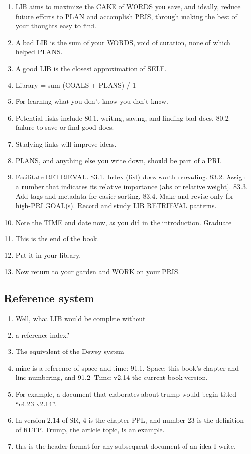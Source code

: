 \documentclass[
]{book}
\providecommand{\tightlist}{%
  \setlength{\itemsep}{0pt}\setlength{\parskip}{0pt}}
\begin{document}
\begin{enumerate}
\def\labelenumi{\arabic{enumi}.}
\setcounter{enumi}{74}
\tightlist
\item
  LIB aims to maximize the CAKE of WORDS you save, and ideally,
  reduce future efforts to PLAN and accomplish PRIS, through making
  the best of your thoughts easy to find.
\item
  A bad LIB is the sum of your WORDS, void of curation, none of which
  helped PLANS.
\item
  A good LIB is the closest approximation of SELF.
\item
  Library = sum (GOALS + PLANS) / 1
\item
  For learning what you don't know you don't know.
\item
  Potential risks include
  80.1. writing, saving, and finding bad docs.
  80.2. failure to save or find good docs.
\item
  Studying links will improve ideas.
\item
  PLANS, and anything else you write down, should be part of a PRI.
\item
  Facilitate RETRIEVAL:
  83.1. Index (list) docs worth rereading.
  83.2. Assign a number that indicates its relative importance (abs or
  relative weight).
  83.3. Add tags and metadata for easier sorting.
  83.4. Make and revise only for high-PRI GOAL(s). Record and study LIB
  RETRIEVAL patterns.
\item
  Note the TIME and date now, as you did in the introduction.
  Graduate
\item
  This is the end of the book.
\item
  Put it in your library.
\item
  Now return to your garden and WORK on your PRIS.
\end{enumerate}

\hypertarget{reference-system}{%
\subsection{Reference system}\label{reference-system}}

\begin{enumerate}
\def\labelenumi{\arabic{enumi}.}
\setcounter{enumi}{87}
\tightlist
\item
  Well, what LIB would be complete without
\item
  a reference index?
\item
  The equivalent of the Dewey system
\item
  mine is a reference of space-and-time:
  91.1. Space: this book's chapter and line numbering, and
  91.2. Time: v2.14 the current book version.
\item
  For example, a document that elaborates about trump would begin titled ``c4.23 v2.14''.
\item
  In version 2.14 of SR, 4 is the chapter PPL, and number 23 is the definition of RLTP. Trump, the article topic, is an example.
\item
  this is the header format for any subsequent document of an idea I write.
\end{enumerate}
\end{document}
